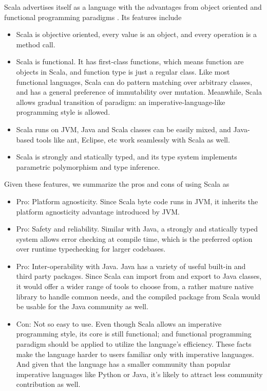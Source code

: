 \documentclass[letterpaper,twocolumn,10pt]{article}
\begin{document}
Scala advertises itself as a language with the advantages from object oriented and functional programming paradigms \cite{Scala}. Its features include
\begin{itemize}
\item Scala is objective oriented, every value is an object, and every operation is a method call.
\item Scala is functional. It has first-class functions, which means function are objects in Scala, and function type is just a regular class. Like most functional languages, Scala can do pattern matching over arbitrary classes, and has a general preference of immutability over mutation. Meanwhile, Scala allows gradual transition of paradigm: an imperative-language-like programming style is allowed.
\item Scala runs on JVM, Java and Scala classes can be easily mixed, and Java-based tools like ant, Eclipse, etc work seamlessly with Scala as well.
\item Scala is strongly and statically typed, and its type system implements parametric polymorphism and type inference. \cite{ScalaTypes}
\end{itemize}
Given these features, we summarize the pros and cons of using Scala as
\begin{itemize}
\item Pro: Platform agnosticity. Since Scala byte code runs in JVM, it inherits the platform agnosticity advantage introduced by JVM.
\item Pro: Safety and reliability. Similar with Java, a strongly and statically typed system allows error checking at compile time, which is the preferred option over runtime typechecking for larger codebases.
\item Pro: Inter-operability with Java. Java has a variety of useful built-in and third party packages. Since Scala can import from and export to Java classes, it would offer a wider range of tools to choose from, a rather mature native library to handle common needs, and the compiled package from Scala would be usable for the Java community as well.
\item Con: Not so easy to use. Even though Scala allows an imperative programming style, its core is still functional; and functional programming paradigm should be applied to utilize the language's efficiency. These facts make the language harder to users familiar only with imperative languages. And given that the language has a smaller community than popular imperative languages like Python or Java, it's likely to attract less community contribution as well.
\end{itemize}

{\footnotesize 
}
\end{document}
